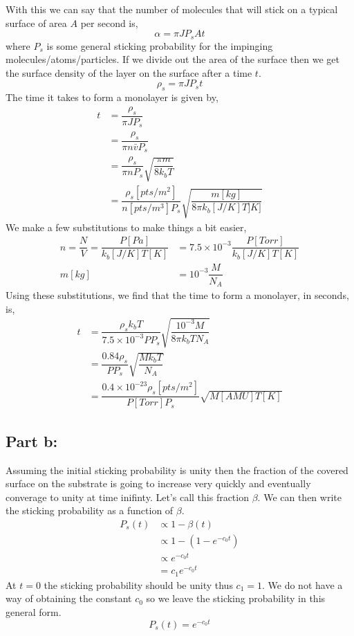 \documentclass[12pt]{article}
\renewcommand{\=}[1]{\stackrel{#1}{=}} %
\theoremstyle{definition}
\theoremstyle{remark}
\begin{document}
With this we can say that the number of molecules that will stick on a typical surface of area $A$ per second is,
\[
	\alpha = \pi J P_s At
\]
where $P_s$ is some general sticking probability for the impinging molecules/atoms/particles. If we divide out the area of the surface then we get the surface density of the layer on the surface after a time $t$.
\[
	\rho_s = \pi JP_s t
\]
The time it takes to form a monolayer is given by,
\begin{align*}
	t &= \dfrac{\rho_s}{\pi JP_s}\\[3mm]
		&= \dfrac{\rho_s}{\pi n\bar{v} P_s}\\[3mm]
		&= \dfrac{\rho_s}{\pi n P_s}\sqrt{\dfrac{\pi m}{8k_bT}}\\[3mm]
		&= \dfrac{\rho_{s}[pts/m^2]}{n[pts/m^3]P_s}\sqrt{\dfrac{m[kg]}{8\pi k_b[J/K] T]K]}}
\end{align*}
We make a few substitutions to make things a bit easier,
\begin{align*}
	n = \dfrac{N}{V} = \dfrac{P[Pa]}{k_b[J/K] T[K]} &= 7.5\times10^{-3} \dfrac{P[Torr]}{k_b[J/K]T[K]}\\[3mm]
	m[kg] &= 10^{-3}\dfrac{M}{N_A}
\end{align*}
Using these substitutions, we find that the time to form a monolayer, in seconds, is,
\begin{align*}
	t &= \dfrac{\rho_sk_b T}{7.5\times10^{-3}PP_s}\sqrt{\dfrac{10^{-3}M}{8\pi k_bTN_A}}\\[3mm]
		&= \dfrac{0.84 \rho_s }{PP_s}\sqrt{\dfrac{Mk_bT}{N_A}}\\[3mm]
		&= \dfrac{0.4\times10^{-23}\rho_s[pts/m^2]}{P[Torr]P_s}\sqrt{M[AMU]T[K]}
\end{align*}


\subsection*{Part b:}

Assuming the initial sticking probability is unity then the fraction of the covered surface on the substrate is going to increase very quickly and eventually converage to unity at time inifinty. Let's call this fraction $\beta$. We can then write the sticking probability as a function of $\beta$.
\begin{align*}
	P_s(t) &\propto 1-\beta(t)\\[3mm]
		&\propto 1-\left(1-e^{-c_0t}\right)\\[3mm]
		&\propto e^{-c_0t}\\[3mm]
		&= c_1e^{-c_0t}
\end{align*}
At $t=0$ the sticking probability should be unity thus $c_1=1$. We do not have a way of obtaining the constant $c_0$ so we leave the sticking probability in this general form.
\[
	P_s(t) = e^{-c_0t}
\]
\end{document}
